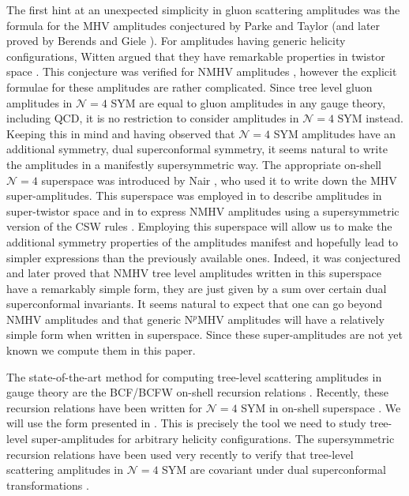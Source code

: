 \documentclass[12pt]{article}
\begin{document}
The first hint at an unexpected simplicity in gluon scattering
amplitudes was the formula for the MHV amplitudes conjectured by Parke
and Taylor
\cite{Parke:1986gb} (and later proved by Berends and Giele
\cite{Berends:1987me}). For amplitudes having generic helicity
configurations, Witten argued that they have remarkable properties
in twistor space \cite{Witten:2003nn}. This conjecture was
verified for NMHV amplitudes \cite{Britto:2004tx,Bern:2004bt},
however the explicit formulae \cite{Kosower:2004yz} for these amplitudes are
rather complicated. Since tree
level gluon amplitudes in $\mathcal{N}=4$ SYM are equal to gluon
amplitudes in any gauge theory, including QCD, it is no
restriction to consider amplitudes in $\mathcal{N}=4$ SYM instead.
Keeping this in mind and having observed that $\mathcal{N}=4$ SYM
amplitudes have an additional symmetry, dual superconformal
symmetry, it seems natural to write the amplitudes in a manifestly
supersymmetric way. The appropriate on-shell $\mathcal{N}=4$
superspace was introduced by Nair \cite{Nair:1988bq}, who
used it to write down the MHV super-amplitudes. This superspace was employed in \cite{Witten:2003nn} to describe amplitudes in super-twistor space and in \cite{Georgiou:2004by} to express NMHV amplitudes using a supersymmetric version of the CSW rules \cite{Cachazo:2004kj}. Employing this
superspace will allow us to make the additional symmetry
properties of the amplitudes manifest and hopefully lead
to simpler expressions than the previously available ones.
Indeed, it was conjectured \cite{dhks5} and later proved \cite{dhks6}
that NMHV tree level amplitudes written in this
superspace have a remarkably simple form, they are just given by a
sum over certain dual superconformal invariants. It seems natural
to expect that one can go beyond NMHV amplitudes and that generic
N${}^{p}$MHV amplitudes will have a relatively simple form when
written in superspace. Since these super-amplitudes are not yet
known we compute them in this paper.

The state-of-the-art method for computing tree-level scattering
amplitudes in gauge theory are the BCF/BCFW on-shell recursion
relations \cite{Britto:2004ap,Britto:2005fq}. Recently, these
recursion relations have been written for $\mathcal{N}=4$ SYM in
on-shell superspace \cite{Bianchi:2008pu,arkani,Brandhuber:2008pf,ArkaniHamed:2008gz,Elvang:2008na}.
We will use the form presented in \cite{arkani,Brandhuber:2008pf,ArkaniHamed:2008gz}.
This is precisely the
tool we need to study tree-level super-amplitudes for arbitrary
helicity configurations.
The supersymmetric recursion relations have been used very recently
to verify that tree-level scattering amplitudes in $\mathcal{N}=4$ SYM are covariant
under dual superconformal transformations \cite{Brandhuber:2008pf}.
\end{document}
